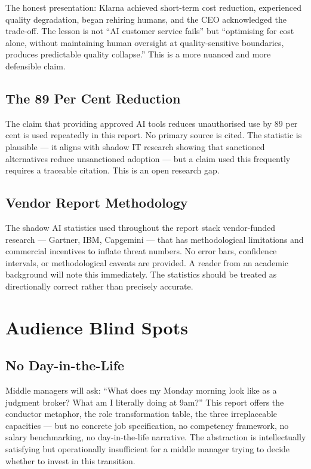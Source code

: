 The honest presentation: Klarna achieved short-term cost reduction, experienced quality degradation, began rehiring humans, and the CEO acknowledged the trade-off. The lesson is not ``AI customer service fails'' but ``optimising for cost alone, without maintaining human oversight at quality-sensitive boundaries, produces predictable quality collapse.'' This is a more nuanced and more defensible claim.

\subsection{The 89 Per Cent Reduction}

The claim that providing approved AI tools reduces unauthorised use by 89 per cent is used repeatedly in this report. No primary source is cited. The statistic is plausible --- it aligns with shadow IT research showing that sanctioned alternatives reduce unsanctioned adoption --- but a claim used this frequently requires a traceable citation. This is an open research gap.

\subsection{Vendor Report Methodology}

The shadow AI statistics used throughout the report stack vendor-funded research --- Gartner, IBM, Capgemini --- that has methodological limitations and commercial incentives to inflate threat numbers. No error bars, confidence intervals, or methodological caveats are provided. A reader from an academic background will note this immediately. The statistics should be treated as directionally correct rather than precisely accurate.

\section{Audience Blind Spots}

\subsection{No Day-in-the-Life}

Middle managers will ask: ``What does my Monday morning look like as a judgment broker? What am I literally doing at 9am?'' This report offers the conductor metaphor, the role transformation table, the three irreplaceable capacities --- but no concrete job specification, no competency framework, no salary benchmarking, no day-in-the-life narrative. The abstraction is intellectually satisfying but operationally insufficient for a middle manager trying to decide whether to invest in this transition.

